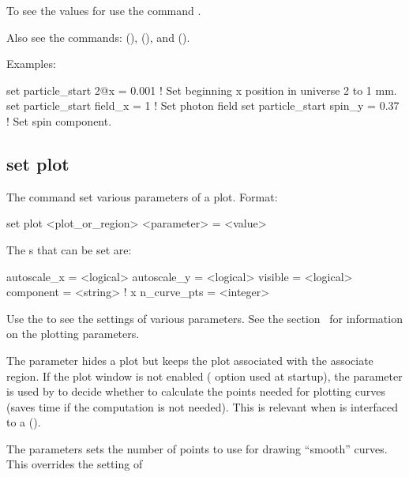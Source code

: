 {{To see the values for  use the command .

Also see the commands:  (),  (), 
and  ().

Examples:
\begin{example}
  set particle_start 2@x = 0.001         ! Set beginning x position in universe 2 to 1 mm.
  set particle_start field_x = 1         ! Set photon field
  set particle_start spin_y = 0.37       ! Set spin component.
\end{example}


\subsection{set plot}
\label{s:set.plot}

The  command set various parameters of a plot. Format:
\begin{example}
  set plot <plot_or_region> <parameter> = <value>
\end{example}

The s that can be set are:
\begin{example}
  autoscale_x        = <logical>
  autoscale_y        = <logical>
  visible            = <logical>
  component          = <string>    ! 
  x%
  n_curve_pts        = <integer>
\end{example}
Use the  to see the settings of various parameters. See the
section~ for information on the plotting parameters.

The  parameter hides a plot but keeps the plot associated with the associate region. If
the plot window is not enabled ( option used at startup), the  parameter is
used by \tao to decide whether to calculate the points needed for plotting curves (saves time if the
computation is not needed). This is relevant when \tao is interfaced to a 
().

The  parameters sets the number of points to use for drawing ``smooth''
curves. This overrides the setting of \vn{plot_page%
will cache intermediate calculations used to compute a smooth curve to use in the computation of
other smooth curves. \tao will only do this for curves that have \vn{plot_page%
of points. Depending upon the circumstances, setting \vn{plot%
slow down plotting calculations significantly.

}}}}}
